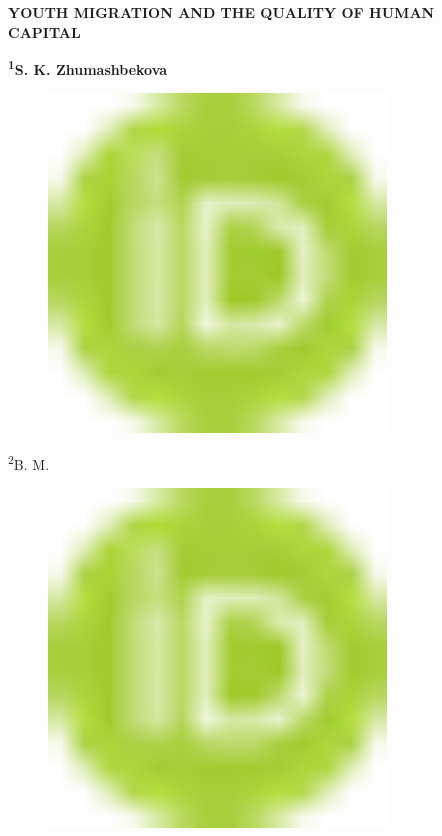 
{\bfseries YOUTH MIGRATION AND THE QUALITY OF HUMAN CAPITAL}

{\bfseries \textsuperscript{1}S. K. Zhumashbekova}
\begin{figure}[H]
	\centering
	\includegraphics[width=0.8\textwidth]{media/ekon/image1}
	\caption*{}
\end{figure}

\textsuperscript{2}B. M.
\begin{figure}[H]
	\centering
	\includegraphics[width=0.8\textwidth]{media/ekon/image1}
	\caption*{}
\end{figure}

